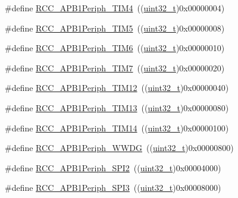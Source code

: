 \begin{DoxyCompactItemize}
\item 
\#define \hyperlink{group___a_p_b1__peripheral_ga80f9f3720804a97210b723696bd94d83}{R\+C\+C\+\_\+\+A\+P\+B1\+Periph\+\_\+\+T\+I\+M4}~((\hyperlink{_p_e___types_8h_a33594304e786b158f3fb30289278f5af}{uint32\+\_\+t})0x00000004)
\item 
\#define \hyperlink{group___a_p_b1__peripheral_ga4905c26000a571fa01fc057fe31d254a}{R\+C\+C\+\_\+\+A\+P\+B1\+Periph\+\_\+\+T\+I\+M5}~((\hyperlink{_p_e___types_8h_a33594304e786b158f3fb30289278f5af}{uint32\+\_\+t})0x00000008)
\item 
\#define \hyperlink{group___a_p_b1__peripheral_ga4974e8b8f11d54fbc0bac1988ff6254c}{R\+C\+C\+\_\+\+A\+P\+B1\+Periph\+\_\+\+T\+I\+M6}~((\hyperlink{_p_e___types_8h_a33594304e786b158f3fb30289278f5af}{uint32\+\_\+t})0x00000010)
\item 
\#define \hyperlink{group___a_p_b1__peripheral_ga9415b0c46db5318bdee3f868c16b8d35}{R\+C\+C\+\_\+\+A\+P\+B1\+Periph\+\_\+\+T\+I\+M7}~((\hyperlink{_p_e___types_8h_a33594304e786b158f3fb30289278f5af}{uint32\+\_\+t})0x00000020)
\item 
\#define \hyperlink{group___a_p_b1__peripheral_ga0a4ec40233160ca20adaa571073e7bcd}{R\+C\+C\+\_\+\+A\+P\+B1\+Periph\+\_\+\+T\+I\+M12}~((\hyperlink{_p_e___types_8h_a33594304e786b158f3fb30289278f5af}{uint32\+\_\+t})0x00000040)
\item 
\#define \hyperlink{group___a_p_b1__peripheral_ga34397b722f46f31e898136fb51a7523a}{R\+C\+C\+\_\+\+A\+P\+B1\+Periph\+\_\+\+T\+I\+M13}~((\hyperlink{_p_e___types_8h_a33594304e786b158f3fb30289278f5af}{uint32\+\_\+t})0x00000080)
\item 
\#define \hyperlink{group___a_p_b1__peripheral_ga7100c45768eea1484f6fd519b53e287d}{R\+C\+C\+\_\+\+A\+P\+B1\+Periph\+\_\+\+T\+I\+M14}~((\hyperlink{_p_e___types_8h_a33594304e786b158f3fb30289278f5af}{uint32\+\_\+t})0x00000100)
\item 
\#define \hyperlink{group___a_p_b1__peripheral_gad84e40be78ddc40b8eae1c2b0898f6b1}{R\+C\+C\+\_\+\+A\+P\+B1\+Periph\+\_\+\+W\+W\+DG}~((\hyperlink{_p_e___types_8h_a33594304e786b158f3fb30289278f5af}{uint32\+\_\+t})0x00000800)
\item 
\#define \hyperlink{group___a_p_b1__peripheral_gaa21f1dfb4fcf241c6f85a048eaca29df}{R\+C\+C\+\_\+\+A\+P\+B1\+Periph\+\_\+\+S\+P\+I2}~((\hyperlink{_p_e___types_8h_a33594304e786b158f3fb30289278f5af}{uint32\+\_\+t})0x00004000)
\item 
\#define \hyperlink{group___a_p_b1__peripheral_gabb0b40e839ef7403b086482e89d56f35}{R\+C\+C\+\_\+\+A\+P\+B1\+Periph\+\_\+\+S\+P\+I3}~((\hyperlink{_p_e___types_8h_a33594304e786b158f3fb30289278f5af}{uint32\+\_\+t})0x00008000)

\end{DoxyCompactItemize}
